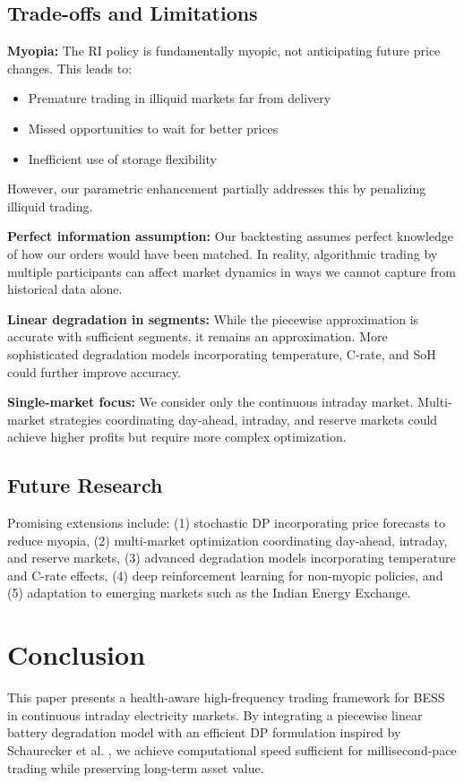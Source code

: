 \documentclass[10pt,twocolumn]{article}
\begin{document}
\subsection{Trade-offs and Limitations}
\textbf{Myopia:} The RI policy is fundamentally myopic, not anticipating future price changes. This leads to:
\begin{itemize}
\item Premature trading in illiquid markets far from delivery
\item Missed opportunities to wait for better prices
\item Inefficient use of storage flexibility
\end{itemize}
However, our parametric enhancement partially addresses this by penalizing illiquid trading.

\textbf{Perfect information assumption:} Our backtesting assumes perfect knowledge of how our orders would have been matched. In reality, algorithmic trading by multiple participants can affect market dynamics in ways we cannot capture from historical data alone.

\textbf{Linear degradation in segments:} While the piecewise approximation is accurate with sufficient segments, it remains an approximation. More sophisticated degradation models incorporating temperature, C-rate, and SoH could further improve accuracy.

\textbf{Single-market focus:} We consider only the continuous intraday market. Multi-market strategies coordinating day-ahead, intraday, and reserve markets could achieve higher profits but require more complex optimization.

\subsection{Future Research}
Promising extensions include: (1) stochastic DP incorporating price forecasts to reduce myopia, (2) multi-market optimization coordinating day-ahead, intraday, and reserve markets, (3) advanced degradation models incorporating temperature and C-rate effects, (4) deep reinforcement learning for non-myopic policies, and (5) adaptation to emerging markets such as the Indian Energy Exchange.

\section{Conclusion}
This paper presents a health-aware high-frequency trading framework for BESS in continuous intraday electricity markets. By integrating a piecewise linear battery degradation model \cite{xu2017factoring} with an efficient DP formulation inspired by Schaurecker et al. \cite{schaurecker2025maximizing}, we achieve computational speed sufficient for millisecond-pace trading while preserving long-term asset value.
\end{document}
